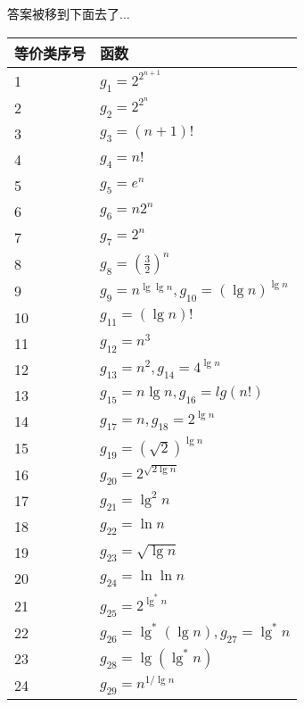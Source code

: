 \documentclass[a4paper, justified]{tufte-handout}
\begin{document}
\begin{solution}

  答案被移到下面去了...
  \begin{table}[]
    \begin{tabular}{|l|l|}
      \hline
      等价类序号 & 函数                                          \\ \hline
      1          & $g_1 = 2^{2^{n + 1}}$                         \\ \hline
      2          & $g_2 = 2^{2^{n}}$                             \\ \hline
      3          & $g_3 = (n + 1)!$                              \\ \hline
      4          & $g_4 = n!$                                    \\ \hline
      5          & $g_5 = e^n$                                   \\ \hline
      6          & $g_6 = n2^n$                                  \\ \hline
      7          & $g_7 = 2 ^n$                                  \\ \hline
      8          & $g_8 = (\frac{3}{2})^n$                       \\ \hline
      9          & $g_9 = n^{\lg \lg n},g_10 = (\lg n) ^{\lg n}$ \\ \hline
      10         & $g_{11} = (\lg n)!$                           \\ \hline
      11         & $g_{12} = n^3$                                \\ \hline
      12         & $g_{13} = n^2,g_{14} = 4^{\lg n}$             \\ \hline
      13         & $g_15 = n\lg n, g_{16} = lg(n!)$              \\ \hline
      14         & $g_{17} = n,g_{18} = 2^{\lg n}$               \\ \hline
      15         & $g_{19} = (\sqrt{2})^{\lg n}$                 \\ \hline
      16         & $g_{20} = 2^{\sqrt{2 \lg n}}$                 \\ \hline
      17         & $g_{21} = \lg^2n$                             \\ \hline
      18         & $g_{22} = \ln n$                              \\ \hline
      19         & $g_{23} = \sqrt{\lg n}$                       \\ \hline
      20         & $g_{24} = \ln \ln n$                          \\ \hline
      21         & $g_{25} = 2^{\lg^*n}$                         \\ \hline
      22         & $g_{26} = \lg^*(\lg n), g_{27} = \lg^*n$      \\ \hline
      23         & $g_{28} = \lg(\lg^*n)$                        \\ \hline
      24         & $g_{29} = n^{1/\lg n}$                        \\ \hline
    \end{tabular}
  \end{table}

\end{solution}
\end{document}
